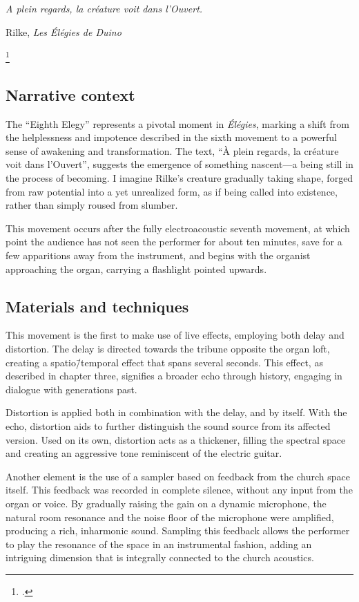 \documentclass[12pt,twoside,maitrise]{dms_ks}
\theoremstyle{definition}
\begin{document}
{\epigraph{\textit{A plein regards, la créature voit dans l’Ouvert.}}{Rilke, \textit{Les Élégies de Duino}\protect\footnotemark}

\footcitetext[75]{rilke_egies_1986}

\subsection{Narrative context}

The “Eighth Elegy” represents a pivotal moment in \textit{Élégies}, marking a shift from the helplessness and impotence described in the sixth movement to a powerful sense of awakening and transformation. 
The text, “À plein regards, la créature voit dans l’Ouvert”, suggests the emergence of something nascent---a being still in the process of becoming. 
I imagine Rilke's creature gradually taking shape, forged from raw potential into a yet unrealized form, as if being called into existence, rather than simply roused from slumber.

This movement occurs after the fully electroacoustic seventh movement, at which point the audience has not seen the performer for about ten minutes, save for a few apparitions away from the instrument, and begins with the organist approaching the organ, carrying a flashlight pointed upwards. 

\subsection{Materials and techniques}

This movement is the first to make use of live effects, employing both delay and distortion. 
The delay is directed towards the tribune opposite the organ loft, creating a spatio\=/temporal effect that spans several seconds. 
This effect, as described in chapter three, signifies a broader echo through history, engaging in dialogue with generations past. 

Distortion is applied both in combination with the delay, and by itself.
With the echo, distortion aids to further distinguish the sound source from its affected version.
Used on its own, distortion acts as a thickener, filling the spectral space and creating an aggressive tone reminiscent of the electric guitar.

Another element is the use of a sampler based on feedback from the church space itself. 
This feedback was recorded in complete silence, without any input from the organ or voice. 
By gradually raising the gain on a dynamic microphone, the natural room resonance and the noise floor of the microphone were amplified, producing a rich, inharmonic sound. 
Sampling this feedback allows the performer to play the resonance of the space in an instrumental fashion, adding an intriguing dimension that is integrally connected to the church acoustics. 

}
\end{document}
